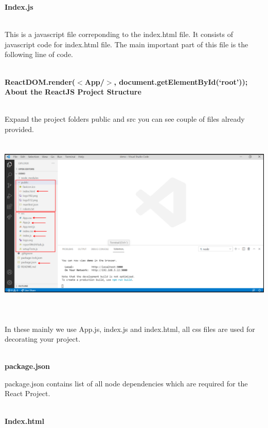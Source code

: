 \documentclass{article}
\begin{document}
\noindent \textbf{Index.js}

\noindent\\
 This is a javascript file correponding to the index.html file. It consists of javascript code for index.html file. The main important part of this file is the following line of code.

\noindent\\
 \textbf{ReactDOM.render($\boldsymbol{\mathrm{<}}$App/$\boldsymbol{\mathrm{>}}$, document.getElementById(`root'));}
\noindent\\
 \textbf{About the ReactJS Project Structure} \textbf{}

\noindent 

\noindent\\
 Expand the project folders public and src you can see couple of files already provided.

\noindent 

\begin{center}
	\noindent \includegraphics*[width=6.09in, height=3.30in]{IMG-07-09}
\end{center}

\noindent 

\noindent\\
 In these mainly we use App.js, index.js and index.html, all css files are used for decorating your project.

\noindent 

\noindent\\
 \textbf{package.json}

\noindent
 package.json contains list of all node dependencies which are required for the React Project.

\noindent  

\noindent\\
 \textbf{Index.html}
\end{document}
